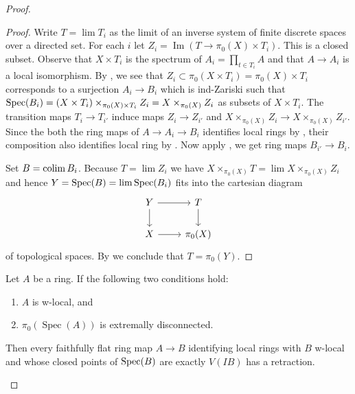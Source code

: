 \begin{proof}
\begin{proof}
  Write $T = \lim T_i$ as the limit of an inverse system of finite discrete spaces over a directed set. For each $i$ let $Z_i = \operatorname{Im} (T \to \pi_0(X) \times T_i)$. This is a closed subset. Observe that $X \times T_i$ is the spectrum of $A_i = \prod_{t \in T_i} A$ and that $A \to A_i$ is a local isomorphism. By , we see that $Z_i \subset \pi_0(X \times T_i) = \pi_0(X) \times T_i$ corresponds to a surjection $A_i \to B_i$ which is ind-Zariski such that $\operatorname{Spec} (B_i) = (X \times T_i) \times_{\pi_0(X) \times T_i} Z_i = X \times_{\pi_0(X)} Z_i$ as subsets of $X \times T_i$. The transition maps $T_i \to T_{i'}$ induce maps $Z_i \to Z_{i'}$ and $X \times_{\pi_0(X)} Z_i \to X \times_{\pi_0(X)} Z_{i'}$. Since the both the ring maps of \(A \to A_{i} \to B_{i}\) identifies local rings by , their composition also identifies local ring by . Now apply , we
  get ring maps $B_{i'} \to B_i$. 

  Set $B = \operatorname{colim} B_i$. Because $T = \lim Z_i$ we have $X \times_{\pi_0(X)} T = \lim X \times_{\pi_0(X)} Z_i$ and hence $Y = \operatorname{Spec} (B) = \lim \operatorname{Spec} (B_i)$ fits into the cartesian diagram
  \[
  \begin{tikzcd}
  Y \arrow[r] \arrow[d] & T \arrow[d] \\
  X \arrow[r] & \pi_0(X)
  \end{tikzcd}
  \]
  of topological spaces. By  we conclude that $T = \pi_0(Y)$.
\end{proof}

\begin{lemma}
  \label{thm:ff-identifies-local-rings-plus-c-has-retraction-if}
  Let $A$ be a ring. If the following two conditions hold:
  \begin{enumerate}
    \item $A$ is w-local, and
    \item $\pi_0(\operatorname{Spec}(A))$ is extremally disconnected.
  \end{enumerate}
  Then every faithfully flat ring map $A \to B$ identifying local rings with \(B\) w-local and whose closed points of \(\operatorname{Spec} (B)\) are exactly \(V(IB)\) has a retraction.
\end{lemma}


\end{proof}
